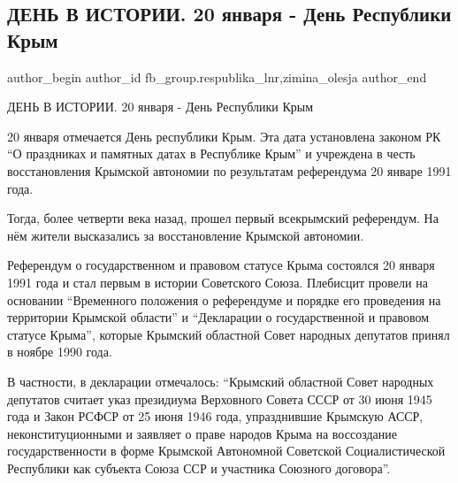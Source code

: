  
 
 
 
 
 
\subsection{ДЕНЬ В ИСТОРИИ. 20 января - День Республики Крым}
\label{sec:20_01_2022.fb.fb_group.respublika_lnr.2.den_respubliki_krym}
 
\ifcmt
 author_begin
   author_id fb_group.respublika_lnr,zimina_olesja
 author_end
\fi

ДЕНЬ В ИСТОРИИ. 20 января - День Республики Крым

20 января отмечается День республики Крым. Эта дата установлена законом РК \enquote{О
праздниках и памятных датах в Республике Крым} и учреждена в честь
восстановления Крымской автономии по результатам референдума 20 январе 1991
года.


Тогда, более четверти века назад, прошел первый всекрымский референдум. На нём
жители высказались за восстановление Крымской автономии.

Референдум о государственном и правовом статусе Крыма состоялся 20 января 1991
года и стал первым в истории Советского Союза. Плебисцит провели на основании
\enquote{Временного положения о референдуме и порядке его проведения на территории
Крымской области} и \enquote{Декларации о государственной и правовом статусе Крыма},
которые Крымский областной Совет народных депутатов принял в ноябре 1990 года.

В частности, в декларации отмечалось: \enquote{Крымский областной Совет народных
депутатов считает указ президиума Верховного Совета СССР от 30 июня 1945 года и
Закон РСФСР от 25 июня 1946 года, упразднившие Крымскую АССР,
неконституционными и заявляет о праве народов Крыма на воссоздание
государственности в форме Крымской Автономной Советской Социалистической
Республики как субъекта Союза ССР и участника Союзного договора}.

